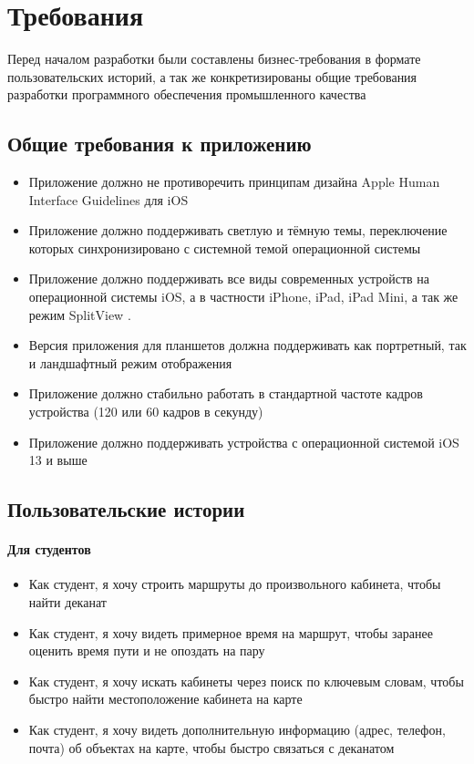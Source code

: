 \chapter{Требования}
  Перед началом разработки были составлены бизнес-требования в формате пользовательских историй, а так же конкретизированы общие требования разработки программного обеспечения промышленного качества

  \section{Общие требования к приложению}
    \begin{itemize}
      \item Приложение должно не противоречить принципам дизайна Apple Human Interface Guidelines для iOS \cite{HumanInterfaceGuidelines}
      \item Приложение должно поддерживать светлую и тёмную темы, переключение которых синхронизировано с системной темой операционной системы
      \item Приложение должно поддерживать все виды современных устройств на операционной системы iOS, а в частности iPhone, iPad, iPad Mini, а так же режим SplitView \cite{SplitView}.
      \item Версия приложения для планшетов должна поддерживать как портретный, так и ландшафтный режим отображения
      \item Приложение должно стабильно работать в стандартной частоте кадров устройства (120 или 60 кадров в секунду)
      \item Приложение должно поддерживать устройства с операционной системой iOS 13 и выше
    \end{itemize}

  \section{Пользовательские истории}
    \subsubsection{Для студентов}
      \begin{itemize}
        \item Как студент, я хочу строить маршруты до произвольного кабинета, чтобы найти деканат
        \item Как студент, я хочу видеть примерное время на маршрут, чтобы заранее оценить время пути и не опоздать на пару
        \item Как студент, я хочу искать кабинеты через поиск по ключевым словам, чтобы быстро найти местоположение кабинета на карте
        \item Как студент, я хочу видеть дополнительную информацию (адрес, телефон, почта) об объектах на карте, чтобы быстро связаться с деканатом
      \end{itemize}
